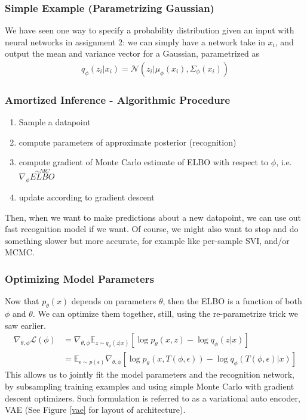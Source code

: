\documentclass[11pt]{article}
\begin{document}
\subsubsection{Simple Example (Parametrizing Gaussian)}
We have seen one way to specify a probability distribution given an input with neural networks in assignment 2: we can simply have a network take in $x_i$, and output the mean and variance vector for a Gaussian, parametrized as
\begin{align}
    q_{\phi}\left(z_{i} | x_{i}\right)=\mathcal{N}\left(z_{i} | \mu_{\phi}\left(x_{i}\right), \Sigma_{\phi}\left(x_{i}\right)\right)
\end{align}

\subsubsection{Amortized Inference - Algorithmic Procedure}
\begin{enumerate}
    \item Sample a datapoint
    \item compute parameters of approximate posterior (recognition)
    \item compute gradient of Monte Carlo estimate of ELBO with respect to $\phi$, i.e. $\nabla_\phi \overset{\sim MC}{ELBO}$
    \item update according to gradient descent
\end{enumerate}
Then, when we want to make predictions about a new datapoint, we can use out fast recognition model if we want. Of course, we might also want to stop and do something slower but more accurate, for example like per-sample SVI, and/or MCMC.

\subsubsection{Optimizing Model Parameters}
Now that $p_\theta (x)$ depends on parameters $\theta$, then the ELBO is a function of both $\phi$ and $\theta$. We can optimize them together, still, using the re-parametrize trick we saw earlier.
\begin{align}
    \nabla_{\theta, \phi} \mathcal{L}(\phi)
    &=\nabla_{\theta, \phi} \mathbb{E}_{z \sim q_{\phi}(z | x)}\left[\log p_{\theta}(x, z)-\log q_{\phi}(z | x)\right] \\
    &=\mathbb{E}_{\epsilon \sim p(\epsilon)} \nabla_{\theta, \phi}\left[\log p_{\theta}(x, T(\phi, \epsilon))-\log q_{\phi}(T(\phi, \epsilon) | x)\right]
\end{align}
This allows us to jointly fit the model parameters and the recognition network, by subsampling training examples and using simple Monte Carlo with gradient descent optimizers. Such formulation is referred to as a variational auto encoder, VAE (See Figure \ref{vae} for layout of architecture).
\end{document}
